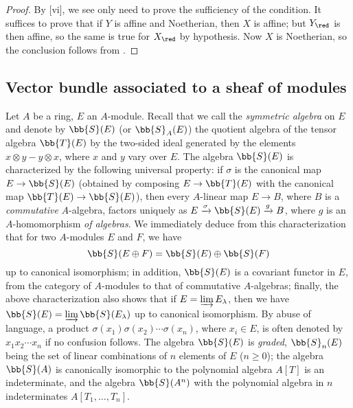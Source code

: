 \begin{proof}
\label{proof-2.1.6.4}
By [vi], we see only need to prove the sufficiency of the condition.
It suffices to prove that if $Y$ is affine and Noetherian, then $X$ is affine; but $Y_\red$ is then affine, so the same is true for $X_\red$ by hypothesis.
Now $X$ is Noetherian, so the conclusion follows from .
\end{proof}

\subsection{Vector bundle associated to a sheaf of modules}
\label{subsection:2.1.7}

\begin{env}[1.7.1]
\label{2.1.7.1}
Let $A$ be a ring, $E$ an $A$-module.
Recall that we call the \emph{symmetric algebra} on $E$ and denote by $\bb{S}(E)$ (or $\bb{S}_A(E)$) the quotient algebra of the tensor algebra $\bb{T}(E)$ by the two-sided ideal generated by the elements $x\otimes y-y\otimes x$, where $x$ and $y$ vary over $E$.
The algebra $\bb{S}(E)$ is characterized by the following universal property: if $\sigma$ is the canonical map $E\to\bb{S}(E)$ (obtained by composing $E\to\bb{T}(E)$ with the canonical map $\bb{T}(E)\to\bb{S}(E)$), then every $A$-linear map $E\to B$, where $B$ is a \emph{commutative} $A$-algebra, factors uniquely as $E\xrightarrow{\sigma}\bb{S}(E)\xrightarrow{g}B$, where $g$ is an $A$-homomorphism \emph{of algebras}.
We immediately deduce from this characterization that for two $A$-modules $E$ and $F$, we have
\[
  \bb{S}(E\oplus F)=\bb{S}(E)\oplus\bb{S}(F)
\]
up to canonical isomorphism; in addition, $\bb{S}(E)$ is a covariant functor in $E$, from the category of $A$-modules to that of commutative $A$-algebras; finally, the above characterization also shows that if $E=\varinjlim E_\lambda$, then we have $\bb{S}(E)=\varinjlim\bb{S}(E_\lambda)$ up to canonical isomorphism.
By abuse of language, a product $\sigma(x_1)\sigma(x_2)\cdots\sigma(x_n)$, where $x_i\in E$, is often denoted by $x_1 x_2\cdots x_n$ if no confusion follows.
The algebra $\bb{S}(E)$ is \emph{graded}, $\bb{S}_n(E)$ being the set of linear combinations of $n$ elements of $E$ ($n\geq 0$); the algebra $\bb{S}(A)$ is canonically isomorphic to the polynomial algebra $A[T]$ is an indeterminate, and the algebra $\bb{S}(A^n)$ with the polynomial algebra in $n$ indeterminates $A[T_1,\dots,T_n]$.
\end{env}

